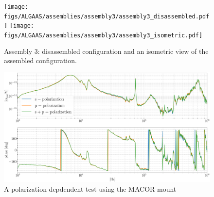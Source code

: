 \begin{figure}[!ht]
    \begin{subcaptiongroup}
	    \texttt{[image: figs/ALGAAS/assemblies/assembly3/assembly3\_disassembled.pdf]}
	    \label{subfig:A3disassembled}
	    \texttt{[image: figs/ALGAAS/assemblies/assembly3/assembly3\_isometric.pdf]}
	    \label{subfig:A3isometric}
    \end{subcaptiongroup}
    \caption{Assembly 3:  disassembled configuration and  an isometric view of the assembled configuration.}
    \label{fig:assembly3}
\end{figure}


\begin{figure}[H]
    \includegraphics[width=\textwidth]{figs/ALGAAS/results_figs/assembly3/petgmsvv64.pdf}
    \caption{A polarization depdendent test using the MACOR mount}
    \label{fig:measurementsum}
\end{figure}

